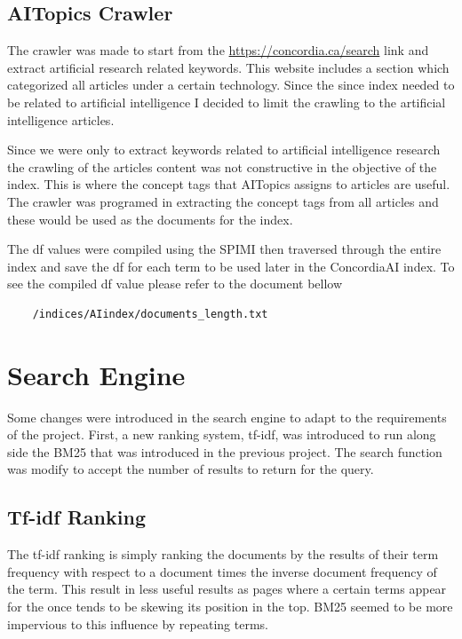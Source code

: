 \subsection{AITopics Crawler}

\par The crawler was made to start from the \url{https://concordia.ca/search} link and extract artificial research related keywords. This website includes a section which categorized all articles under a certain technology. Since the since index needed to be related to artificial intelligence I decided to limit the crawling to the artificial intelligence articles.
\par Since we were only to extract keywords related to artificial intelligence research the crawling of the articles content was not constructive in the objective of the index. This is where the concept tags that AITopics assigns to articles are useful. The crawler was programed in extracting the concept tags from all articles and these would be used as the documents for the index.
\par The df values were compiled using the SPIMI then traversed through the entire index and save the df for each term to be used later in the ConcordiaAI index. To see the compiled df value please refer to the document bellow
\begin{verbatim}
    /indices/AIindex/documents_length.txt
\end{verbatim}


\section{Search Engine}

\par Some changes were introduced in the search engine to adapt to the requirements of the project. First, a new ranking system, tf-idf, was introduced to run along side the BM25 that was introduced in the previous project. The search function was modify to accept the number of results to return for the query.

\subsection{Tf-idf Ranking} \label{tf-idf}

The tf-idf ranking is simply ranking the documents by the results of their term frequency with respect to a document times the inverse document frequency of the term. This result in less useful results as pages where a certain terms appear for the once tends to be skewing its position in the top. BM25 seemed to be more impervious to this influence by repeating terms.

